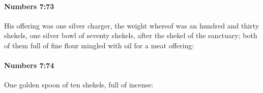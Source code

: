		\paragraph{Numbers 7:73} %
			\label{NUMBERS-7-73}

			His offering was one silver charger, the weight whereof was an hundred and thirty shekels, one silver bowl of seventy shekels, after the shekel of the sanctuary; both of them full of fine flour mingled with oil for a meat offering:


		\paragraph{Numbers 7:74} %
			\label{NUMBERS-7-74}

			One golden spoon of ten shekels, full of incense:


